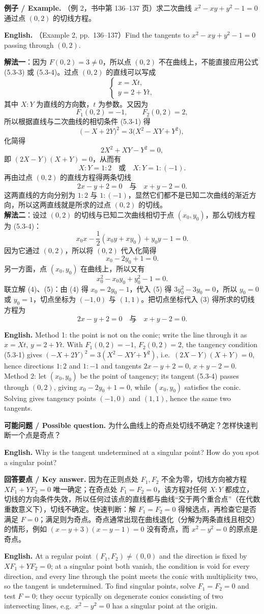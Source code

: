 \documentclass[UTF8,11pt,a4paper]{ctexart}
\newcommand{\EN}[1]{\par\noindent \textbf{English.} #1\par}
\newcommand{\EX}[2]{\par\noindent \textbf{例子 / Example.} #1\par\EN{#2}}
\newcommand{\ASK}[4]{\par\noindent \textbf{可能问题 / Possible question.} #1\par\EN{#2}\noindent \textbf{回答要点 / Key answer.} #3\par\EN{#4}\medskip}
\theoremstyle{definition}
\begin{document}
\EX{（例 2，书中第 136--137 页）求二次曲线 $x^2-xy+y^2-1=0$ 通过点 $(0,2)$ 的切线方程。}{（Example 2, pp.~136--137）Find the tangents to $x^2-xy+y^2-1=0$ passing through $(0,2)$.}
\textbf{解法一}：因为 $F(0,2)=3\ne0$，所以点 $(0,2)$ 不在曲线上，不能直接应用公式 (5.3-3) 或 (5.3-4)。过点 $(0,2)$ 的直线可以写成
\[
\begin{cases}x=Xt,\\ y=2+Yt,\end{cases}
\]
其中 $X:Y$ 为直线的方向数，$t$ 为参数。又因为
\[
F_1(0,2)=-1,\qquad F_2(0,2)=2,
\]
所以根据直线与二次曲线的相切条件 (5.3-1) 得
\[
\bigl(-X+2Y\bigr)^2=3\bigl(X^2-XY+Y^2\bigr),
\]
化简得
\[
2X^2+XY-Y^2=0,
\]
即 $(2X-Y)(X+Y)=0$，从而有
\[
X:Y=1:2\quad\text{或}\quad X:Y=1:(-1).
\]
再由过点 $(0,2)$ 的直线方程得两条切线
\[
2x-y+2=0\quad\text{与}\quad x+y-2=0.
\]
这两直线的方向分别为 $1:2$ 与 $1:(-1)$，显然它们都不是已知二次曲线的渐近方向，所以这两直线就是所求的过点 $(0,2)$ 的切线。\\[2pt]
\textbf{解法二}：设过 $(0,2)$ 的切线与已知二次曲线相切于点 $(x_0,y_0)$，那么切线方程为 (5.3-4)：
\[
x_0x-\frac12(x_0y+xy_0)+y_0y-1=0.\tag{3}
\]
因为它通过 $(0,2)$，所以将 $(0,2)$ 代入化简得
\[
x_0-2y_0+1=0.\tag{4}
\]
另一方面，点 $(x_0,y_0)$ 在曲线上，所以又有
\[
x_0^2-x_0y_0+y_0^2-1=0.\tag{5}
\]
联立解 (4)、(5)：由 (4) 得 $x_0=2y_0-1$，代入 (5) 得 $3y_0^2-3y_0=0$，所以 $y_0=0$ 或 $y_0=1$，切点坐标为 $(-1,0)$ 与 $(1,1)$。把切点坐标代入 (3) 得所求的切线方程为
\[
2x-y+2=0\quad\text{与}\quad x+y-2=0.
\]
\EN{Method 1: the point is not on the conic; write the line through it as $x=Xt$, $y=2+Yt$. With $F_1(0,2)=-1$, $F_2(0,2)=2$, the tangency condition (5.3-1) gives $(-X+2Y)^2=3(X^2-XY+Y^2)$, i.e.\ $(2X-Y)(X+Y)=0$, hence directions $1:2$ and $1:-1$ and tangents $2x-y+2=0$, $x+y-2=0$. Method 2: let $(x_0,y_0)$ be the point of tangency; its tangent (5.3-4) passes through $(0,2)$, giving $x_0-2y_0+1=0$, while $(x_0,y_0)$ satisfies the conic. Solving gives tangency points $(-1,0)$ and $(1,1)$, hence the same two tangents.}

\ASK{为什么曲线上的奇点处切线不确定？怎样快速判断一个点是奇点？}{Why is the tangent undetermined at a singular point? How do you spot a singular point?}{因为在正则点处 $F_1,F_2$ 不全为零，切线方向被方程 $XF_1+YF_2=0$ 唯一确定；在奇点处 $F_1=F_2=0$，该方程对任何 $X:Y$ 都成立，切线的方向条件失效，所以任何过该点的直线都与曲线``交于两个重合点''（在代数重数意义下），切线不确定。快速判断：解 $F_1=F_2=0$ 得候选点，再检查它是否满足 $F=0$；满足则为奇点。奇点通常出现在曲线退化（分解为两条直线且相交）的情形，例如 $(x-y+3)(x-y-1)=0$ 没有奇点，而 $x^2-y^2=0$ 的原点是奇点。}{At a regular point $(F_1,F_2)\ne(0,0)$ and the direction is fixed by $XF_1+YF_2=0$; at a singular point both vanish, the condition is void for every direction, and every line through the point meets the conic with multiplicity two, so the tangent is undetermined. To find singular points, solve $F_1=F_2=0$ and test $F=0$; they occur typically on degenerate conics consisting of two intersecting lines, e.g.\ $x^2-y^2=0$ has a singular point at the origin.}
\end{document}
